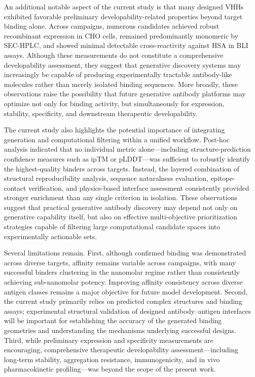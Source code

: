 \documentclass[11pt]{article}
\begin{document}
An additional notable aspect of the current study is that many designed VHHs exhibited favorable preliminary developability-related properties beyond target binding alone. Across campaigns,
numerous candidates achieved robust recombinant expression in CHO cells, remained predominantly monomeric by SEC-HPLC, and showed minimal detectable cross-reactivity against HSA in
BLI assays. Although these measurements do not constitute a comprehensive developability assessment, they suggest that generative discovery systems may increasingly be capable of producing
experimentally tractable antibody-like molecules rather than merely isolated binding sequences.
More broadly, these observations raise the possibility that future generative antibody platforms
may optimize not only for binding activity, but simultaneously for expression, stability, specificity,
and downstream therapeutic developability.

The current study also highlights the potential importance of integrating generation and computational filtering within a unified workflow. Post-hoc analysis indicated that no individual metric
alone---including structure-prediction confidence measures such as ipTM or pLDDT---was sufficient
to robustly identify the highest-quality binders across targets. Instead, the layered combination of
structural reproducibility analysis, sequence naturalness evaluation, epitope-contact verification,
and physics-based interface assessment consistently provided stronger enrichment than any single
criterion in isolation. These observations suggest that practical generative antibody discovery may
depend not only on generative capability itself, but also on effective multi-objective prioritization
strategies capable of filtering large computational candidate spaces into experimentally actionable
sets.

Several limitations remain. First, although confirmed binding was demonstrated across diverse
targets, affinity remains variable across campaigns, with many successful binders clustering in
the nanomolar regime rather than consistently achieving sub-nanomolar potency. Improving
affinity consistency across diverse antigen classes remains a major objective for future model
development. Second, the current study primarily relies on predicted complex structures and
binding assays; experimental structural validation of designed antibody--antigen interfaces will be
important for establishing the accuracy of the generated binding geometries and understanding the
mechanisms underlying successful designs. Third, while preliminary expression and specificity
measurements are encouraging, comprehensive therapeutic developability assessment---including
long-term stability, aggregation resistance, immunogenicity, and in vivo pharmacokinetic profiling---was beyond the scope of the present work.
\end{document}
